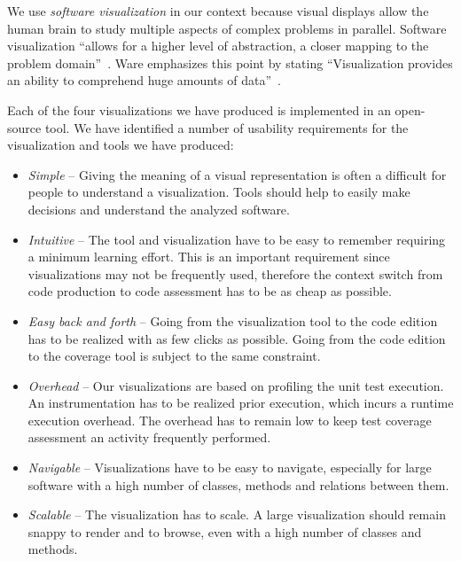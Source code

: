 \documentclass[runningheads]{llncs}
\begin{document}
We use \emph{software visualization} in our context because visual displays allow the human brain to study multiple aspects of complex problems in parallel. Software visualization ``allows for a higher level of abstraction, a closer mapping to the problem domain''~\cite{Petr95a}. Ware emphasizes this point by stating ``Visualization provides an ability to comprehend huge amounts of data''~\cite{Ware00a}. 

Each of the four visualizations we have produced is implemented in an open-source tool.  %
We have identified a number of usability requirements for the visualization and tools we have produced:

\begin{itemize}
\item \emph{Simple} -- Giving the meaning of a visual representation is often a difficult for people to understand a visualization. Tools should help to easily make decisions and understand the analyzed software.

\item \emph{Intuitive} -- The tool and visualization have to be easy to remember requiring a minimum learning effort. This is an important requirement since visualizations may not be frequently used, therefore the context switch from code production to code assessment has to be as cheap as possible. 

\item \emph{Easy back and forth} -- Going from the visualization tool to the code edition has to be realized with as few clicks as possible. Going from the code edition to the coverage tool is subject to the same constraint. 

\item \emph{Overhead} -- Our visualizations are based on profiling the unit test execution. An instrumentation has to be realized prior execution, which incurs a runtime execution overhead. The overhead has to remain low to keep test coverage assessment an activity frequently performed. 

\item \emph{Navigable} -- Visualizations have to be easy to navigate, especially for large software with a high number of classes, methods and relations between them.

\item \emph{Scalable} -- The visualization has to scale. A large visualization should remain snappy to render and to browse, even with a high number of classes and methods.
\end{itemize}
\end{document}
